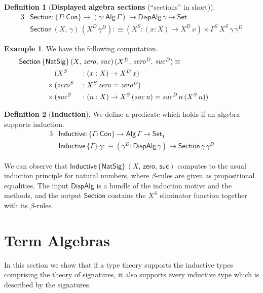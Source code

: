 \documentclass[12pt,a4paper,twoside,openany]{book}
\theoremstyle{remark}
\theoremstyle{definition}
\newtheorem{mydefinition}{Definition}
\newtheorem{myexample}{Example}
\theoremstyle{theorem}
\newcommand{\mi}[1]{\mathit{#1}}
\newcommand{\ms}[1]{\mathsf{#1}}
\newcommand{\Con}{\mathsf{Con}}
\newcommand{\Set}{\mathsf{Set}}
\newcommand{\Alg}{\ms{Alg}}
\newcommand{\DispAlg}{\ms{DispAlg}}
\newcommand{\Section}{\ms{Section}}
\newcommand{\Inductive}{\ms{Inductive}}
\newcommand{\defn}{:\equiv}
\begin{document}
\begin{mydefinition}[\textbf{Displayed algebra sections} (``sections'' in short)]
\begin{alignat*}{3}
  & \Section : \{\Gamma : \Con\} \to (\gamma : \Alg\,\Gamma) \to \DispAlg\,\gamma \to \Set\\
  & \Section\,(X,\,\gamma)\,(X^D\,\gamma^D) \defn (X^S : (x : X) \to X^D\,x) \times \Gamma^S\,X^S\,\gamma\,\gamma^D
\end{alignat*}
\end{mydefinition}
\begin{myexample} We have the following computation.
\begin{alignat*}{3}
  & \hspace{-5em}\rlap{$\Section\,\{\ms{NatSig}\}\,(X,\,\mi{zero},\,\mi{suc})\,(X^D,\,\mi{zero^D},\,\mi{suc^D}) \equiv$}\\
              & (X^S &&: (x : X) \to X^D\,x)\\
      \times\,& (\mi{zero^S} &&: X^S\,\mi{zero} = \mi{zero^D})\\
      \times\,& (\mi{suc^S} &&: (n : X) \to X^S\,(\mi{suc\,n}) = \mi{suc^D}\,n\,(X^S\,n))
\end{alignat*}
\end{myexample}

\begin{mydefinition}[\textbf{Induction}]
We define a predicate which holds if an algebra supports induction.
\begin{alignat*}{3}
  & \Inductive : \{\Gamma : \Con\} \to \Alg\,\Gamma \to \Set_1\\
  & \Inductive\,\{\Gamma\}\,\gamma \defn
     (\gamma^D : \DispAlg\,\gamma) \to \Section\,\gamma\,\gamma^D
\end{alignat*}
\end{mydefinition}

We can observe that $\Inductive\,\{\ms{NatSig}\}\,(X,\,\ms{zero},\,\ms{suc})$
computes to the usual induction principle for natural numbers, where
$\beta$-rules are given as propositional equalities. The input $\DispAlg$ is a
bundle of the induction motive and the methods, and the output $\Section$
contains the $X^S$ eliminator function together with its $\beta$-rules.

\section{Term Algebras}

In this section we show that if a type theory supports the inductive types comprising
the theory of signatures, it also supports every inductive type which is described
by the signatures.
\end{document}
